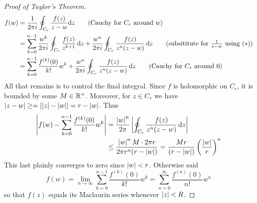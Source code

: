 \begin{proof}[Proof of Taylor's Theorem]
\begin{align*}
f(w)&=\frac 1{2\pi i}\oint_{C_r}\frac{f(z)}{z-w}\dz\tag{Cauchy for $C_r$ around $w$}\\
	&=\sum_{k=0}^{n-1}\frac{w^k}{2\pi i}\oint_{C_r}\frac{f(z)}{z^{k+1}}\,\dz +\frac{w^n}{2\pi i}\oint_{C_r}\frac{f(z)}{z^n(z-w)}\,\dz\tag{subsititute for $\frac 1{z-w}$ using $(\ast)$}\\
 &=\sum_{k=0}^{n-1} \frac{f^{(k)}(0)}{k!}w^k +\frac{w^n}{2\pi i}\oint_{C_r}\frac{f(z)}{z^n(z-w)}\,\dz\tag{Cauchy for $C_r$ around $0$}
\end{align*}
All that remains is to control the final integral. Since $f$ is holomorphic on $C_r$, it is bounded by some $M\in\mathbb{R}^+$. Moreover, for $z\in C_r$ we have $\left| z-w\right|\ge =\left| \left| z\right|-\left| w\right|\right|= r-\left| w\right|$. Thus
\begin{align*}
\nm{f(w)-\sum_{k=0}^{n-1} \frac{f^{(k)}(0)}{k!}w^k} &= \frac{\nm w^n}{2\pi}\nm{\oint_{C_r}\frac{f(z)}{z^n(z-w)}\,\dz}\\
&\le\frac{\nm w^nM\cdot 2\pi r}{2\pi r^n(r-\nm w)} =\frac{Mr}{(r-\nm w)}\left(\frac{\nm w}r\right)^n %
\end{align*}
This last plainly converges to zero since $\left| w\right|<r$. Otherwise said
\[f(w)=\lim_{n\to\infty}\sum_{k=0}^{n-1} \frac{f^{(k)}(0)}{k!}w^k =\sum_{n=0}^{\infty} \frac{f^{(n)}(0)}{n!}w^n\]
so that $f(z)$ equals its Maclaurin series whenever $\left| z\right|<R$.
\end{proof}


